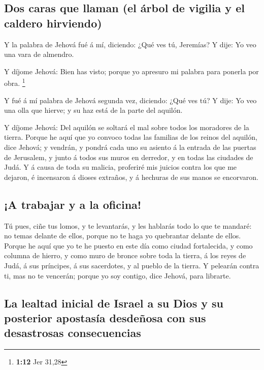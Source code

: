 \hypertarget{dos-caras-que-llaman-el-uxe1rbol-de-vigilia-y-el-caldero-hirviendo}{%
\subsection{Dos caras que llaman (el árbol de vigilia y el caldero
hirviendo)}\label{dos-caras-que-llaman-el-uxe1rbol-de-vigilia-y-el-caldero-hirviendo}}

 Y la palabra de Jehová fué á mí, diciendo: ¿Qué ves tú,
Jeremías? Y dije: Yo veo una vara de almendro.

 Y díjome Jehová: Bien has visto; porque yo apresuro mi
palabra para ponerla por obra. \footnote{\textbf{1:12} Jer 31,28}

 Y fué á mí palabra de Jehová segunda vez, diciendo: ¿Qué
ves tú? Y dije: Yo veo una olla que hierve; y su haz está de la parte
del aquilón.

 Y díjome Jehová: Del aquilón se soltará el mal sobre
todos los moradores de la tierra.  Porque he aquí que yo
convoco todas las familias de los reinos del aquilón, dice Jehová; y
vendrán, y pondrá cada uno su asiento á la entrada de las puertas de
Jerusalem, y junto á todos sus muros en derredor, y en todas las
ciudades de Judá.  Y á causa de toda su malicia,
proferiré mis juicios contra los que me dejaron, é incensaron á dioses
extraños, y á hechuras de sus manos se encorvaron.

\hypertarget{a-trabajar-y-a-la-oficina}{%
\subsection{¡A trabajar y a la
oficina!}\label{a-trabajar-y-a-la-oficina}}

 Tú pues, ciñe tus lomos, y te levantarás, y les hablarás
todo lo que te mandaré: no temas delante de ellos, porque no te haga yo
quebrantar delante de ellos.  Porque he aquí que yo te he
puesto en este día como ciudad fortalecida, y como columna de hierro, y
como muro de bronce sobre toda la tierra, á los reyes de Judá, á sus
príncipes, á sus sacerdotes, y al pueblo de la tierra.  Y
pelearán contra ti, mas no te vencerán; porque yo soy contigo, dice
Jehová, para librarte.

\hypertarget{la-lealtad-inicial-de-israel-a-su-dios-y-su-posterior-apostasuxeda-desdeuxf1osa-con-sus-desastrosas-consecuencias}{%
\subsection{La lealtad inicial de Israel a su Dios y su posterior
apostasía desdeñosa con sus desastrosas
consecuencias}\label{la-lealtad-inicial-de-israel-a-su-dios-y-su-posterior-apostasuxeda-desdeuxf1osa-con-sus-desastrosas-consecuencias}}

